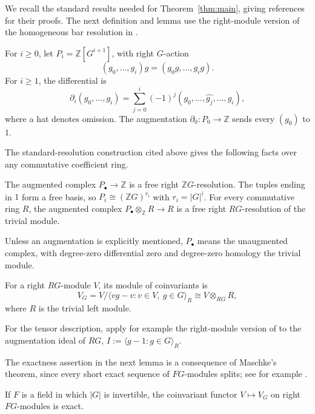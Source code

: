 \documentclass[11pt,a4paper]{amsart}
\numberwithin{equation}{section}
\newcommand{\Z}{\mathbb Z}
\begin{document}
We recall the standard results needed for Theorem~\ref{thm:main},
giving references for their proofs. The next definition and lemma use the right-module version of the
homogeneous bar resolution in \cite[\S3.4, pp.~63--64]{Ben}.

\begin{definition}\label{def:bar-resolution}
For $i\geq0$, let $P_i=\Z[G^{i+1}]$, with right $G$-action
\[
 (g_0,\ldots,g_i)g=(g_0g,\ldots,g_ig).
\]
For $i\geq1$, the differential is
\[
 \partial_i(g_0,\ldots,g_i)=
 \sum_{j=0}^i(-1)^j
 (g_0,\ldots,\widehat{g_j},\ldots,g_i),
\]
where a hat denotes omission. The augmentation
$\partial_0:P_0\to\Z$ sends every $(g_0)$ to $1$.
\end{definition}

The standard-resolution construction cited above gives the
following facts over any commutative coefficient ring.

\begin{lemma}\label{lem:bar-resolution}
The augmented complex $P_\bullet\to\Z$ is a free right
$\Z G$-resolution. The tuples ending in $1$ form a free basis,
so $P_i\cong(\Z G)^{r_i}$ with $r_i=|G|^i$.
For every commutative ring $R$, the augmented complex
$P_\bullet\otimes_\Z R\to R$ is a free right $RG$-resolution
of the trivial module.
\end{lemma}

Unless an augmentation is explicitly mentioned, $P_\bullet$
means the unaugmented complex, with degree-zero differential zero
and degree-zero homology the trivial module.

\begin{definition}\label{def:coinvariants}
For a right $RG$-module $V$, its module of coinvariants is
\[
 V_G=V/\langle vg-v:v\in V,\ g\in G\rangle_R
 \cong V\otimes_{RG}R,
\]
where $R$ is the trivial left module.
\end{definition}
For the tensor description, apply for example the right-module version of
\cite[Proposition~2.3.8, pp.~144--145]{Lin} to the augmentation
ideal of $RG$, $I:=\langle g-1\colon g\in G\rangle_R$.

The exactness assertion in the next lemma is a consequence of Maschke's
theorem, since every short exact sequence of $FG$-modules splits;
see for example \cite[Corollary~3.6.12, p.~72]{Ben}.

\begin{lemma}\label{lem:averaging}
If $F$ is a field in which $|G|$ is invertible, the coinvariant
functor $V\mapsto V_G$ on right $FG$-modules is exact.
\end{lemma}
\end{document}
